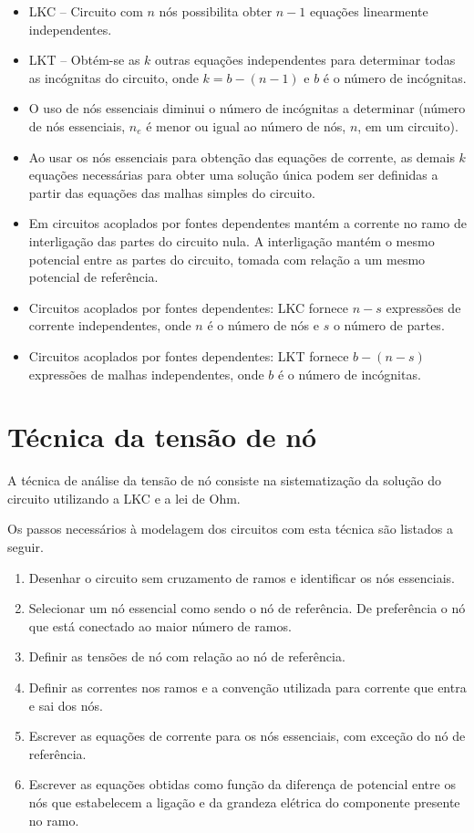 \documentclass[12pt,fleqn]{book} %
\begin{document}
\begin{itemize}
\item LKC – Circuito com $n$ nós possibilita obter $n-1$ equações linearmente independentes.
\item LKT – Obtém-se as $k$ outras equações independentes para determinar todas as incógnitas do circuito, onde $k=b-(n-1)$ e $b$ é o número de incógnitas.
\item O uso de nós essenciais diminui o número de incógnitas a determinar (número de nós essenciais, $n_e$ é menor ou igual ao número de nós, $n$, em um circuito).
\item Ao usar os nós essenciais para obtenção das equações de corrente, as demais $k$ equações necessárias para obter uma solução única podem ser definidas a partir das equações das malhas simples do circuito.
\item Em circuitos acoplados por fontes dependentes mantém a corrente no ramo de interligação das partes do circuito nula. A interligação mantém o mesmo potencial entre as partes do circuito, tomada com relação a um mesmo potencial de referência.
\item Circuitos acoplados por fontes dependentes: LKC fornece $n-s$ expressões de corrente independentes, onde $n$ é o número de nós e $s$ o número de partes.
\item Circuitos acoplados por fontes dependentes: LKT fornece $b-(n-s)$ expressões de malhas independentes, onde $b$ é o número de incógnitas.
\end{itemize}

\section{Técnica da tensão de nó}
        
 A técnica de análise da tensão de nó consiste na sistematização da solução do circuito utilizando a LKC e a lei de Ohm.
 
 Os passos necessários à modelagem dos circuitos com esta técnica são listados a seguir.

 \begin{enumerate}
 \item Desenhar o circuito sem cruzamento de ramos e identificar os nós essenciais.
 \item Selecionar um nó essencial como sendo o nó de referência. De preferência o nó que está conectado ao maior número de ramos.
 \item Definir as tensões de nó com relação ao nó de referência.
 \item Definir as correntes nos ramos e a convenção utilizada para corrente que entra e sai dos nós.
 \item Escrever as equações de corrente para os nós essenciais, com exceção do nó de referência.
 \item Escrever as equações obtidas como função da diferença de potencial entre os nós que estabelecem a ligação e da grandeza elétrica do componente presente no ramo.
 \end{enumerate}
\end{document}
